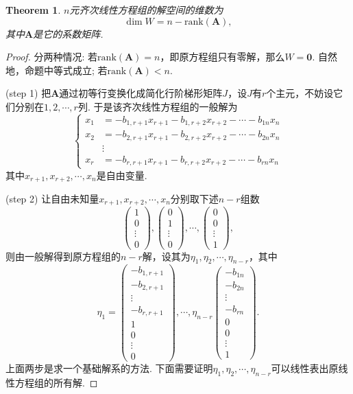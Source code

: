 \documentclass{article}
\newtheorem{theorem}{Theorem}[section]
\newcommand{\mbf}[1]{\bm{#1}}
\newcommand{\rank}[1]{\text{rank}\left(#1\right)} %
\begin{document}
\begin{theorem}\label{homogeneous-linear-equation: the-dimension-of-sulotion-space}
\rm $n$元齐次线性方程组的解空间的维数为
$$
\dim W = n - \text{rank}(\mbf{A}),
$$
其中$\mbf{A}$是它的系数矩阵.
\end{theorem}

\begin{proof}
分两种情况: 若$\rank{\mbf{A}} = n$，即原方程组只有零解，那么$W = {\mbf{0}}$. 自然地，命题中等式成立; 若$\rank{\mbf{A}} < n$.

(step 1) 把$\mbf{A}$通过初等行变换化成简化行阶梯形矩阵$J$，设$J$有$r$个主元，不妨设它们分别在$1,2,\cdots,r$列. 于是该齐次线性方程组的一般解为
$$
\left\{
\begin{array}{ll}
x_1 &= -b_{1,r+1}x_{r+1} - b_{1,r+2}x_{r+2} - \cdots - b_{1n} x_{n} \\
x_2 &= -b_{2,r+1}x_{r+1} - b_{2,r+2}x_{r+2} - \cdots - b_{2n} x_{n} \\
&\vdots \\
x_r &= -b_{r,r+1}x_{r+1} - b_{r,r+2}x_{r+2} - \cdots - b_{rn} x_{n}
\end{array}
\right.
$$
其中$x_{r+1},x_{r+2},\cdots,x_{n}$是自由变量.

(step 2) 让自由未知量$x_{r+1},x_{r+2},\cdots,x_{n}$分别取下述$n-r$组数
$$
\begin{pmatrix}
1 \\
0 \\
\vdots \\
0
\end{pmatrix},
\begin{pmatrix}
0 \\
1 \\
\vdots \\
0
\end{pmatrix},
\cdots,
\begin{pmatrix}
0 \\
0 \\
\vdots \\
1
\end{pmatrix},
$$
则由一般解得到原方程组的$n-r$解，设其为$\eta_1,\eta_2,\cdots,\eta_{n-r}$，其中
$$
\eta_1 = 
\begin{pmatrix}
-b_{1,r+1}\\
-b_{2,r+1}\\
\vdots\\
-b_{r,r+1}\\
1 \\
0 \\
\vdots \\
0
\end{pmatrix},
\cdots,
\eta_{n-r}
\begin{pmatrix}
-b_{1n}\\
-b_{2n}\\
\vdots\\
-b_{rn}\\
0 \\
0 \\
\vdots \\
1
\end{pmatrix}.
$$
上面两步是求一个基础解系的方法. 下面需要证明$\eta_1,\eta_2,\cdots,\eta_{n-r}$可以线性表出原线性方程组的所有解.
\end{proof}
\end{document}
